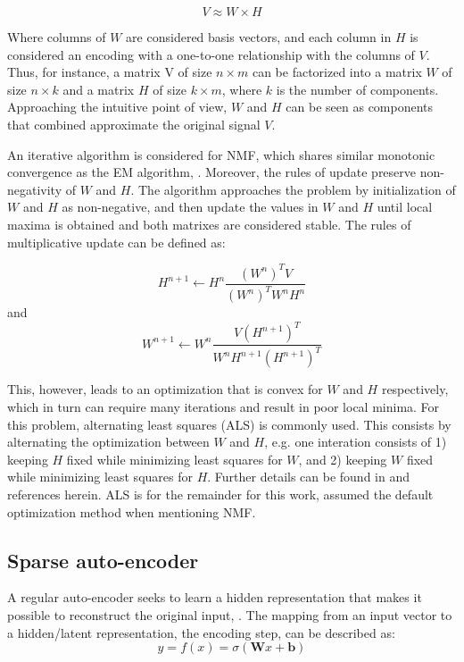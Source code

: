 \documentclass{article}
\begin{document}
\begin{equation}
V \approx W \times H
\end{equation}

Where columns of $W$ are considered basis vectors, and each column in $H$ is considered an encoding with a one-to-one relationship with the columns of $V$. Thus, for instance, a matrix V of size $n \times m$ can be factorized into a matrix $W$ of size $n \times k$ and a matrix $H$ of size $k \times m$, where $k$ is the number of components. Approaching the intuitive point of view, $W$ and $H$ can be seen as components that combined approximate the original signal $V$.

An iterative algorithm is considered for NMF, which shares similar monotonic convergence as the EM algorithm, \cite{Dempster1977}. Moreover, the rules of update preserve non-negativity of $W$ and $H$. The algorithm approaches the problem by initialization of $W$ and $H$ as non-negative, and then update the values in $W$ and $H$ until local maxima is obtained and both matrixes are considered stable. The rules of multiplicative update can be defined as:

\begin{equation}
H^{n+1} \leftarrow H^{n} \frac{(W^n)^TV}{(W^n)^TW^nH^n}
\end{equation}
and 
\begin{equation}
W^{n+1} \leftarrow W^{n} \frac{V(H^{n+1})^T}{W^{n}H^{n+1}(H^{n+1})^T}
\end{equation}

This, however, leads to an optimization that is convex for $W$ and $H$ respectively, which in turn can require many iterations and result in poor local minima. For this problem, alternating least squares (ALS) is commonly used. This consists by alternating the optimization between $W$ and $H$, e.g. one interation consists of 1) keeping $H$ fixed while minimizing least squares for $W$, and 2) keeping $W$ fixed while minimizing least squares for $H$. Further details can be found in  \cite{Langville2014} and references herein. ALS is for the remainder for this work, assumed the default optimization method when mentioning NMF.

\subsection{Sparse auto-encoder}
A regular auto-encoder seeks to learn a hidden representation that makes it possible to reconstruct the original input, \cite{Vincent}. The mapping from an input vector to a hidden/latent representation, the encoding step, can be described as:
\begin{equation}
y = f(x) = \sigma(\mathbf{W}x + \mathbf{b})
\end{equation}
\end{document}
